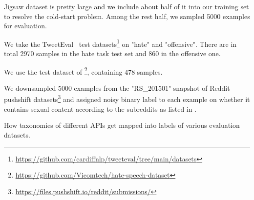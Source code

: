 \documentclass[letterpaper]{article} %
\begin{document}
 Jigsaw dataset is pretty large and we include about half of it into our training set to resolve the cold-start problem. Among the rest half, we sampled 5000 examples for evaluation.

 We take the TweetEval~\cite{barbieri2020tweeteval} test datasets\footnote{\url{https://github.com/cardiffnlp/tweeteval/tree/main/datasets}} on "hate" and "offensive". There are in total 2970 samples in the hate task test set and 860 in the offensive one.

 We use the test dataset of \citet{gibert2018hate}\footnote{\url{https://github.com/Vicomtech/hate-speech-dataset}}, containing 478 samples.

 We downsampled 5000 examples from the "RS\_201501" snapshot of Reddit pushshift datasets\footnote{\url{https://files.pushshift.io/reddit/submissions/}} and assigned noisy binary label to each example on whether it contains sexual content according to the subreddits as listed in \citet{barrientos2020erotic}.

\begin{table*}[t]
    \centering
    \resizebox{\textwidth}{!}{}
    \caption{How taxonomies of different APIs get mapped into labels of various evaluation datasets.}
    \label{ta:taxonomy_matching}
\end{table*}







\end{document}
